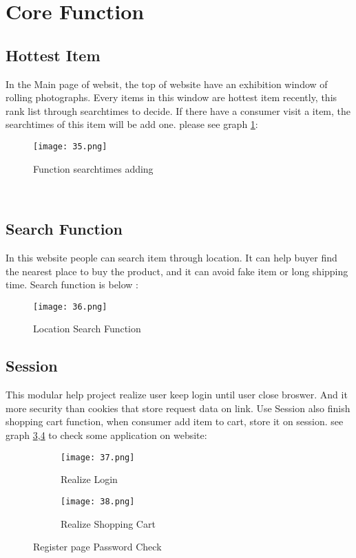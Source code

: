 \section{Core Function}
\subsection{Hottest Item}
In the Main page of websit, the top of website have an exhibition window of rolling photographs. Every items in this window are hottest item recently, this rank list through searchtimes to decide. If there have a consumer visit a item, the searchtimes of this item will be add one.
please see graph \ref{fig:14 cubed graph}:\\   
\begin{figure}[h]
	\centering
	\texttt{[image: 35.png]}
	\caption{Function searchtimes adding}
	\label{fig:14 cubed graph}
\end{figure}
\\
\subsection{Search Function}
In this website people can search item through location. It can help buyer find the nearest place to buy the product, and it can avoid fake item or long shipping time.
Search function is below :
\begin{figure}[h]
	\centering
	\texttt{[image: 36.png]}
	\caption{Location Search Function}
	\label{fig:15 cubed graph}
\end{figure}
\subsection{Session}\cite{session}
This modular help project realize user keep login until user close broswer. And it more security than cookies that store request data on link.
Use Session also finish shopping cart function, when consumer add item to cart, store it on session.
see graph \ref{fig:w cubed graph},\ref{fig:f cubed graph} to check some application on website:
 \begin{figure}
 	\centering
 	\begin{subfigure}[h]{0.4\textwidth}
 		\centering
 		\texttt{[image: 37.png]}
 		\caption{Realize Login}
 		\label{fig:w cubed graph}
 	\end{subfigure}
 	\hfill
 	\begin{subfigure}[h]{0.4\textwidth}
 		\centering
 		\texttt{[image: 38.png]}
 		\caption{Realize Shopping Cart}
 		\label{fig:f cubed graph}
 	\end{subfigure}	
 	\caption{Register page Password Check}
 	\label{fig:16 graphs}
 \end{figure}
 \\
